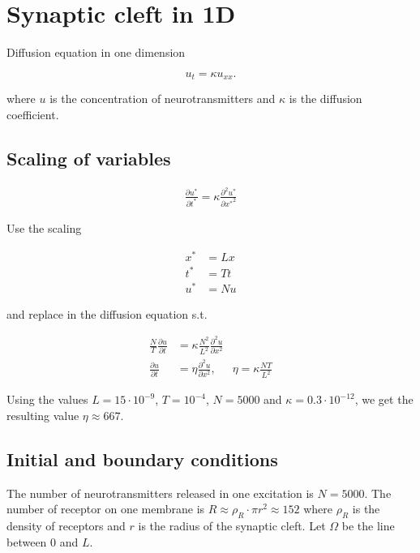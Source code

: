 \section*{Synaptic cleft in 1D}

Diffusion equation in one dimension

\begin{equation}
u_t = \kappa u_{xx}.
\end{equation}

where $u$ is the concentration of neurotransmitters and $\kappa$ is the diffusion coefficient.

\subsection*{Scaling of variables}

\begin{align*}
\frac{\partial u^*}{\partial t^*} = \kappa \frac{\partial^2u^*}{\partial {x^*}^2}
\end{align*}

Use the scaling 

\begin{align*}
x^* &= L x \\
t^* &= T t \\
u^* &= N u 
\end{align*}

and replace in the diffusion equation s.t.

\begin{align*}
\frac{N}{T}\frac{\partial u}{\partial t} &= \kappa \frac{N^2}{L^2}\frac{\partial^2u}{\partial x^2} \\
\frac{\partial u}{\partial t} &= \eta \frac{\partial^2u}{\partial x^2}, & \eta = \kappa\frac{NT}{L^2}
\end{align*}

Using the values $L = 15 \cdot 10^{-9}$, $T = 10^{-4}$, $N = 5000$ and $\kappa = 0.3\cdot 10^{-12}$, we get the resulting value $\eta \approx 667$. 



\subsection*{Initial and boundary conditions}

The number of neurotransmitters released in one excitation is $N = 5000$. The number of receptor on one membrane is $R \approx \rho_R \cdot \pi r^2 \approx 152$ where $\rho_R$ is the density of receptors and $r$ is the radius of the synaptic cleft. Let $\Omega$ be the line between $0$ and $L$.

